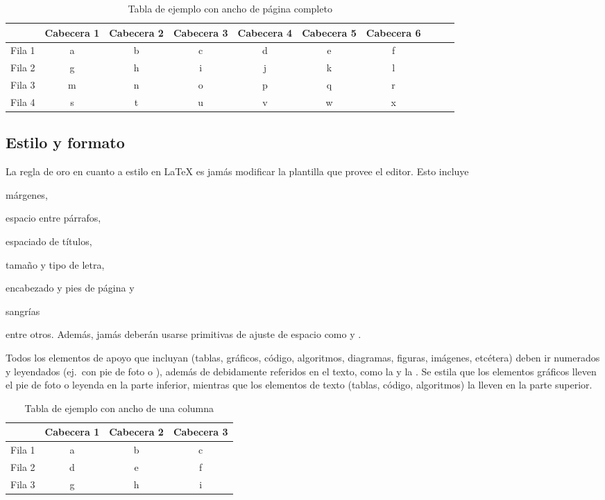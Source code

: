\documentclass[letterpaper,10.5pt,twocolumn]{article}
\begin{document}
\begin{table}[t]
	\centering
	\caption{Tabla de ejemplo con ancho de página completo}%
	\label{tbl:full-width-table} %
	\begin{tabularx}{0.9\textwidth}{X c c c c c c c c c}
	\toprule
	& Cabecera 1 & Cabecera 2 & Cabecera 3
	& Cabecera 4 & Cabecera 5 & Cabecera 6\\
	\midrule
	Fila 1 & a & b & c & d & e & f \\
	Fila 2 & g & h & i & j & k & l \\
	Fila 3 & m & n & o & p & q & r \\
	Fila 4 & s & t & u & v & w & x \\
	\bottomrule
	\end{tabularx}
\end{table}
\subsection{Estilo y formato}
\label{sec:main-style}

La regla de oro en cuanto a estilo en \LaTeX{} es jamás modificar la plantilla que provee el editor.
Esto incluye
\begin{enumerate*}[label=\alph*\rpar]
	\item márgenes,
	\item espacio entre párrafos,
	\item espaciado de títulos,
	\item tamaño y tipo de letra,
	\item encabezado y pies de página
	y
	\item sangrías
\end{enumerate*}
entre otros.
Además, jamás deberán usarse primitivas de ajuste de espacio como  y .

Todos los elementos de apoyo que incluyan (tablas, gráficos, código, algoritmos, diagramas, figuras, imágenes, etcétera) deben ir numerados y leyendados (ej.~con pie de foto o ), además de debidamente referidos en el texto, como la  y la .
Se estila que los elementos gráficos lleven el pie de foto o leyenda en la parte inferior, mientras que los elementos de texto (tablas, código, algoritmos) la lleven en la parte superior.

\begin{table}[H]
	\centering
	\caption{Tabla de ejemplo con ancho de una columna}%
	\label{tbl:column-width-table} %
	\begin{tabularx}{0.9\columnwidth}{X c c c}
	\toprule
	& Cabecera 1 & Cabecera 2 & Cabecera 3 \\
	\midrule
	Fila 1 & a & b & c \\
	Fila 2 & d & e & f \\
	Fila 3 & g & h & i \\
	\bottomrule
	\end{tabularx}
\end{table}
\end{document}
